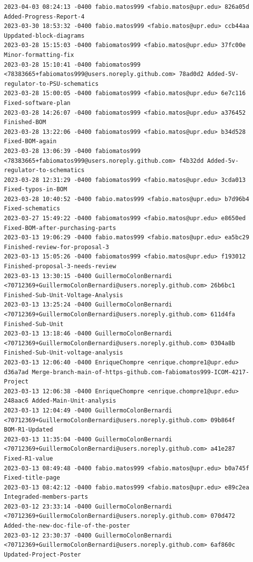 \documentclass[12pt]{article}
\begin{document}
\begin{verbatim}
2023-04-03 08:24:13 -0400 fabio.matos999 <fabio.matos@upr.edu> 826a05d Added-Progress-Report-4
2023-03-30 18:53:32 -0400 fabio.matos999 <fabio.matos@upr.edu> ccb44aa Uppdated-block-diagrams
2023-03-28 15:15:03 -0400 fabiomatos999 <fabio.matos@upr.edu> 37fc00e Minor-formatting-fix
2023-03-28 15:10:41 -0400 fabiomatos999 <78383665+fabiomatos999@users.noreply.github.com> 78ad0d2 Added-5V-regulator-to-PSU-schematics
2023-03-28 15:00:05 -0400 fabiomatos999 <fabio.matos@upr.edu> 6e7c116 Fixed-software-plan
2023-03-28 14:26:07 -0400 fabiomatos999 <fabio.matos@upr.edu> a376452 Finished-BOM
2023-03-28 13:22:06 -0400 fabiomatos999 <fabio.matos@upr.edu> b34d528 Fixed-BOM-again
2023-03-28 13:06:39 -0400 fabiomatos999 <78383665+fabiomatos999@users.noreply.github.com> f4b32dd Added-5v-regulator-to-schematics
2023-03-28 12:31:29 -0400 fabiomatos999 <fabio.matos@upr.edu> 3cda013 Fixed-typos-in-BOM
2023-03-28 10:40:52 -0400 fabio.matos999 <fabio.matos@upr.edu> b7d96b4 Fixed-schematics
2023-03-27 15:49:22 -0400 fabiomatos999 <fabio.matos@upr.edu> e8650ed Fixed-BOM-after-purchasing-parts
2023-03-13 19:06:29 -0400 fabio.matos999 <fabio.matos@upr.edu> ea5bc29 Finished-review-for-proposal-3
2023-03-13 15:05:26 -0400 fabiomatos999 <fabio.matos@upr.edu> f193012 Finished-proposal-3-needs-review
2023-03-13 13:30:15 -0400 GuillermoColonBernardi <70712369+GuillermoColonBernardi@users.noreply.github.com> 26b6bc1 Finished-Sub-Unit-Voltage-Analysis
2023-03-13 13:25:24 -0400 GuillermoColonBernardi <70712369+GuillermoColonBernardi@users.noreply.github.com> 611d4fa Finished-Sub-Unit
2023-03-13 13:18:46 -0400 GuillermoColonBernardi <70712369+GuillermoColonBernardi@users.noreply.github.com> 0304a8b Finished-Sub-Unit-voltage-analysis
2023-03-13 12:06:40 -0400 EnriqueChompre <enrique.chompre1@upr.edu> d36a7ad Merge-branch-main-of-https-github.com-fabiomatos999-ICOM-4217-Project
2023-03-13 12:06:38 -0400 EnriqueChompre <enrique.chompre1@upr.edu> 248aac6 Added-Main-Unit-analysis
2023-03-13 12:04:49 -0400 GuillermoColonBernardi <70712369+GuillermoColonBernardi@users.noreply.github.com> 09b864f BOM-R1-Updated
2023-03-13 11:35:04 -0400 GuillermoColonBernardi <70712369+GuillermoColonBernardi@users.noreply.github.com> a41e287 Fixed-R1-value
2023-03-13 08:49:48 -0400 fabio.matos999 <fabio.matos@upr.edu> b0a745f Fixed-title-page
2023-03-13 08:42:12 -0400 fabio.matos999 <fabio.matos@upr.edu> e89c2ea Integraded-members-parts
2023-03-12 23:33:14 -0400 GuillermoColonBernardi <70712369+GuillermoColonBernardi@users.noreply.github.com> 070d472 Added-the-new-doc-file-of-the-poster
2023-03-12 23:30:37 -0400 GuillermoColonBernardi <70712369+GuillermoColonBernardi@users.noreply.github.com> 6af860c Updated-Project-Poster

\end{verbatim}
\end{document}
